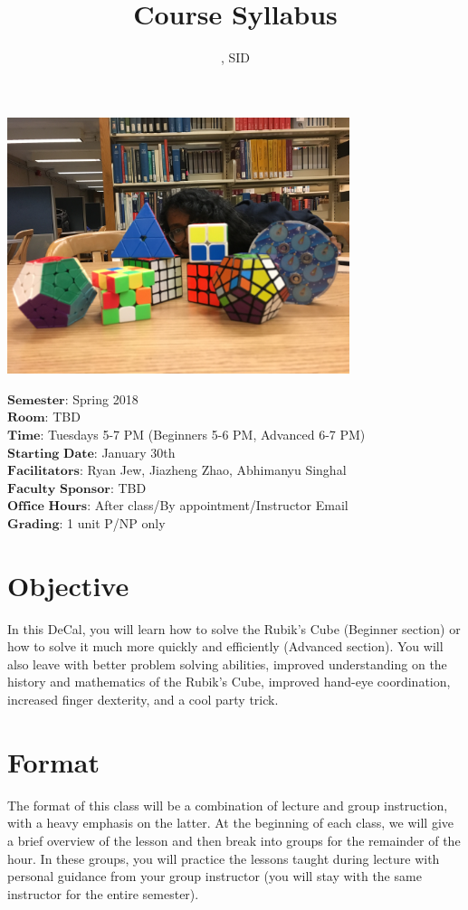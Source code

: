 \documentclass[11pt]{article}
\author{\Name, SID \SID}
\date{}
\begin{document}
\maketitle
\title{Course Syllabus}
\centerline{\includegraphics[width=10cm]{5.JPG}}

$\textbf{Semester}$: Spring 2018\\
$\textbf{Room}$: TBD\\
$\textbf{Time}$: Tuesdays 5-7 PM (Beginners 5-6 PM, Advanced 6-7 PM)\\
$\textbf{Starting Date}$: January 30th\\
$\textbf{Facilitators}$: Ryan Jew, Jiazheng Zhao, Abhimanyu Singhal\\
$\textbf{Faculty Sponsor}$: TBD\\
$\textbf{Office Hours}$: After class/By appointment/Instructor Email \\
$\textbf{Grading}$: 1 unit P/NP only

\section*{Objective}
In this DeCal, you will learn how to solve the Rubik’s Cube (Beginner section) or how to solve it much more quickly and efficiently (Advanced section). You will also leave with better problem solving abilities, improved understanding on the history and mathematics of the Rubik’s Cube, improved hand-eye coordination, increased finger dexterity, and a cool party trick.


\section*{Format}
The format of this class will be a combination of lecture and group instruction, with a heavy emphasis on the latter. At the beginning of each class, we will give a brief overview of the lesson and then break into groups for the remainder of the hour. In these groups, you will practice the lessons taught during lecture with personal guidance from your group instructor (you will stay with the same instructor for the entire semester).
\end{document}
